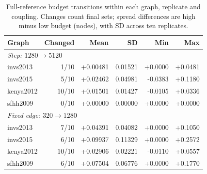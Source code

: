 \begin{table}[htbp]
\caption{Full-reference budget transitions within each graph, replicate and coupling. Changes count final sets; spread differences are high minus low budget (nodes), with SD across ten replicates.}\label{tab:hist-transitions}
\centering\begin{tabular}{lrrrrr}
\toprule
Graph & Changed & Mean & SD & Min & Max\\
\midrule
\multicolumn{6}{l}{\textit{Step: $1280\to5120$}}\\
invs2013 & 1/10 & +0.00481 & 0.01521 & +0.0000 & +0.0481\\
invs2015 & 5/10 & +0.02462 & 0.04981 & -0.0383 & +0.1180\\
kenya2012 & 10/10 & +0.01501 & 0.01427 & -0.0105 & +0.0336\\
sfhh2009 & 0/10 & +0.00000 & 0.00000 & +0.0000 & +0.0000\\
\multicolumn{6}{l}{\textit{Fixed edge: $320\to1280$}}\\
invs2013 & 7/10 & +0.04391 & 0.04082 & +0.0000 & +0.1050\\
invs2015 & 6/10 & +0.09937 & 0.11329 & +0.0000 & +0.2572\\
kenya2012 & 10/10 & +0.02906 & 0.02221 & -0.0110 & +0.0557\\
sfhh2009 & 6/10 & +0.07504 & 0.06776 & +0.0000 & +0.1770\\
\bottomrule
\end{tabular}
\end{table}
